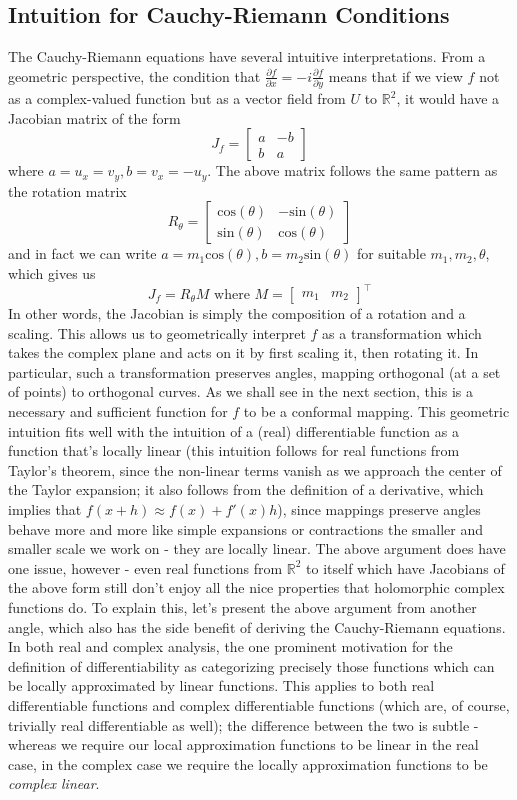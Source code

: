 \documentclass{article}
\newcommand*{\ti}{\textit}
\newcommand*{\nn}{\newline \newline}
\newcommand*{\R}{\mathbb{R}}
\begin{document}
\subsection{Intuition for Cauchy-Riemann Conditions}
The Cauchy-Riemann equations have several intuitive interpretations. From a geometric perspective, the condition that $ \frac{\partial f}{\partial x} = - i \frac{\partial f}{\partial y} $ means that if we view $ f $ not as a complex-valued function but as a vector field from $ U $ to $ \R^2 $, it would have a Jacobian matrix of the form
$$ J_f = \begin{bmatrix}
    a & - b \\
    b & a
\end{bmatrix} $$
where $ a = u_x = v_y, b = v_x = - u_y $. The above matrix follows the same pattern as the rotation matrix
$$ R_\theta = \begin{bmatrix}
    \text{cos}(\theta) & - \text{sin}(\theta) \\
    \text{sin}(\theta) & \text{cos}(\theta)
\end{bmatrix} $$
and in fact we can write $ a = m_1 \text{cos}(\theta), b = m_2 \text{sin}(\theta) $ for suitable $ m_1, m_2, \theta $, which gives us
$$ J_f = R_\theta M \text{ where } M = \begin{bmatrix} m_1 & m_2 \end{bmatrix}^\intercal $$
In other words, the Jacobian is simply the composition of a rotation and a scaling. This allows us to geometrically interpret $ f $ as a transformation which takes the complex plane and acts on it by first scaling it, then rotating it. In particular, such a transformation preserves angles, mapping orthogonal (at a set of points) to orthogonal curves. As we shall see in the next section, this is a necessary and sufficient function for $ f $ to be a conformal mapping. This geometric intuition fits well with the intuition of a (real) differentiable function as a function that's locally linear (this intuition follows for real functions from Taylor's theorem, since the non-linear terms vanish as we approach the center of the Taylor expansion; it also follows from the definition of a derivative, which implies that $ f(x + h) \approx f(x) + f'(x) h $), since mappings preserve angles behave more and more like simple expansions or contractions the smaller and smaller scale we work on - they are locally linear.
\nn
The above argument does have one issue, however - even real functions from $ \R^2 $ to itself which have Jacobians of the above form still don't enjoy all the nice properties that holomorphic complex functions do. To explain this, let's present the above argument from another angle, which also has the side benefit of deriving the Cauchy-Riemann equations. In both real and complex analysis, the one prominent motivation for the definition of differentiability as categorizing precisely those functions which can be locally approximated by linear functions. This applies to both real differentiable functions and complex differentiable functions (which are, of course, trivially real differentiable as well); the difference between the two is subtle - whereas we require our local approximation functions to be linear in the real case, in the complex case we require the locally approximation functions to be \ti{complex linear}.
\end{document}
